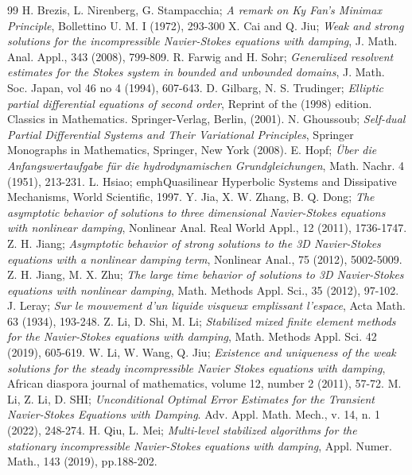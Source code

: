\documentclass[10pt,a4paper]{amsart}
\numberwithin{equation}{section}
\begin{document}
\begin{thebibliography}{99}
 H. Brezis, L. Nirenberg, G. Stampacchia; \emph{A remark on Ky Fan's Minimax Principle}, Bollettino U. M. I (1972), 293-300
 X. Cai and Q. Jiu; \emph{Weak and strong solutions for the incompressible Navier-Stokes equations with damping}, J. Math. Anal. Appl., 343 (2008), 799-809.
 R. Farwig and H. Sohr; \emph{Generalized resolvent estimates for the Stokes system in bounded and unbounded domains}, J. Math. Soc. Japan, vol 46 no 4 (1994), 607-643.
 D. Gilbarg, N. S. Trudinger; \emph{Elliptic partial differential equations of second order}, Reprint of the (1998) edition. Classics in Mathematics. Springer-Verlag, Berlin, (2001).
 N. Ghoussoub; \emph{Self-dual Partial Differential Systems and Their Variational Principles}, Springer Monographs in Mathematics, Springer, New York (2008).
 E. Hopf; \emph{Über die Anfangswertaufgabe für die hydrodynamischen Grundgleichungen}, Math. Nachr. 4 (1951), 213-231.
 L. Hsiao; emph{Quasilinear Hyperbolic Systems and Dissipative Mechanisms}, World Scientific, 1997.
 Y. Jia, X. W. Zhang, B. Q. Dong; \emph{The asymptotic behavior of solutions to three dimensional Navier-Stokes equations with nonlinear damping}, Nonlinear Anal. Real World Appl., 12 (2011), 1736-1747.
 Z. H. Jiang; \emph{Asymptotic behavior of strong solutions to the 3D Navier-Stokes equations with a nonlinear damping term}, Nonlinear Anal., 75 (2012), 5002-5009.
 Z. H. Jiang, M. X. Zhu; \emph{The large time behavior of solutions to 3D Navier-Stokes equations with nonlinear damping}, Math. Methods Appl. Sci., 35 (2012), 97-102.
 J. Leray; \emph{Sur le mouvement d'un liquide visqueux emplissant l'espace}, Acta Math. 63 (1934), 193-248.
 Z. Li, D. Shi, M. Li; \emph{Stabilized mixed finite element methods for the Navier-Stokes equations with damping}, Math. Methods Appl. Sci. 42 (2019), 605-619.
 W. Li, W. Wang, Q. Jiu; \emph{Existence and uniqueness of the weak solutions for the steady incompressible Navier Stokes equations with damping}, African diaspora journal of mathematics, volume 12, number 2 (2011), 57-72.
 M. Li, Z. Li, D. SHI; \emph{Unconditional Optimal Error Estimates for the Transient Navier-Stokes Equations with Damping}. Adv. Appl. Math. Mech., v. 14, n. 1 (2022), 248-274.
 H. Qiu, L. Mei; \emph{Multi-level stabilized algorithms for the stationary incompressible Navier-Stokes equations with damping}, Appl. Numer. Math., 143 (2019), pp.188-202.

\end{thebibliography}
\end{document}
